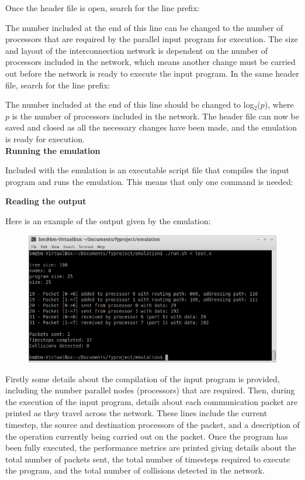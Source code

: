 \documentclass[a4paper, 12pt]{article}
\begin{document}
\noindent Once the header file is open, search for the line prefix:

{}

\noindent The number included at the end of this line can be changed to the number of processors that are required by the parallel input program for execution. The size and layout of the interconnection network is dependent on the number of processors included in the network, which means another change must be carried out before the network is ready to execute the input program. In the same header file, search for the line prefix:

{}

\noindent The number included at the end of this line should be changed to log$_2$($p$), where $p$ is the number of processors included in the network. The header file can now be saved and closed as all the necessary changes have been made, and the emulation is ready for execution.\\

\noindent\textbf{Running the emulation}

\noindent Included with the emulation is an executable script file that compiles the input program and runs the emulation. This means that only one command is needed:

{}

\newpage
\noindent\textbf{Reading the output}

\noindent Here is an example of the output given by the emulation:

\begin{figure}[h]
\centering
\includegraphics[width=\textwidth]{output.png}
\end{figure}

\noindent Firstly some details about the compilation of the input program is provided, including the number parallel nodes (processors) that are required. Then, during the execution of the input program, details about each communication packet are printed as they travel across the network. These lines include the current timestep, the source and destination processors of the packet, and a description of the operation currently being carried out on the packet. Once the program has been fully executed, the performance metrics are printed giving details about the total number of packets sent, the total number of timesteps required to execute the program, and the total number of collisions detected in the network.
\end{document}
